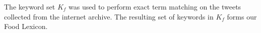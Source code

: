  
The keyword set $K_f$ was used to perform exact term matching on the tweets collected from the internet archive. The resulting set of keywords in $K_f$ forms our Food Lexicon.  



